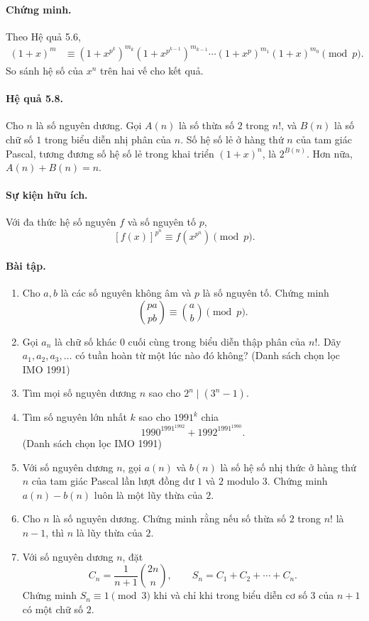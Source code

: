 \documentclass[11pt]{article}
\begin{document}
\paragraph{Chứng minh.}
Theo Hệ quả 5.6,
\[
\begin{aligned}
(1+x)^m
&\equiv(1+x^{p^k})^{m_k}(1+x^{p^{k-1}})^{m_{k-1}}\cdots
(1+x^p)^{m_1}(1+x)^{m_0}\pmod p.
\end{aligned}
\]
So sánh hệ số của \(x^n\) trên hai vế cho kết quả.

\paragraph{Hệ quả 5.8.}
Cho \(n\) là số nguyên dương. Gọi \(A(n)\) là số thừa số \(2\) trong \(n!\),
và \(B(n)\) là số chữ số \(1\) trong biểu diễn nhị phân của \(n\). Số hệ số lẻ
ở hàng thứ \(n\) của tam giác Pascal, tương đương số hệ số lẻ trong khai triển
\((1+x)^n\), là \(2^{B(n)}\). Hơn nữa, \(A(n)+B(n)=n\).

\paragraph{Sự kiện hữu ích.}
Với đa thức hệ số nguyên \(f\) và số nguyên tố \(p\),
\[
 [f(x)]^{p^n}\equiv f(x^{p^n})\pmod p.
\]

\paragraph{Bài tập.}
\begin{enumerate}
\item Cho \(a,b\) là các số nguyên không âm và \(p\) là số nguyên tố. Chứng
minh
\[
 \binom{pa}{pb}\equiv\binom ab\pmod p.
\]
\item Gọi \(a_n\) là chữ số khác \(0\) cuối cùng trong biểu diễn thập phân của
\(n!\). Dãy \(a_1,a_2,a_3,\ldots\) có tuần hoàn từ một lúc nào đó không?
(Danh sách chọn lọc IMO 1991)
\item Tìm mọi số nguyên dương \(n\) sao cho \(2^n\mid(3^n-1)\).
\item Tìm số nguyên lớn nhất \(k\) sao cho \(1991^k\) chia
\[
 1990^{1991^{1992}}+1992^{1991^{1990}}.
\]
(Danh sách chọn lọc IMO 1991)
\item Với số nguyên dương \(n\), gọi \(a(n)\) và \(b(n)\) là số hệ số nhị thức
ở hàng thứ \(n\) của tam giác Pascal lần lượt đồng dư \(1\) và \(2\) modulo
\(3\). Chứng minh \(a(n)-b(n)\) luôn là một lũy thừa của \(2\).
\item Cho \(n\) là số nguyên dương. Chứng minh rằng nếu số thừa số \(2\) trong
\(n!\) là \(n-1\), thì \(n\) là lũy thừa của \(2\).
\item Với số nguyên dương \(n\), đặt
\[
 C_n=\frac1{n+1}\binom{2n}{n},\qquad S_n=C_1+C_2+\cdots+C_n.
\]
Chứng minh \(S_n\equiv1\pmod3\) khi và chỉ khi trong biểu diễn cơ số \(3\) của
\(n+1\) có một chữ số \(2\).
\end{enumerate}
\end{document}
